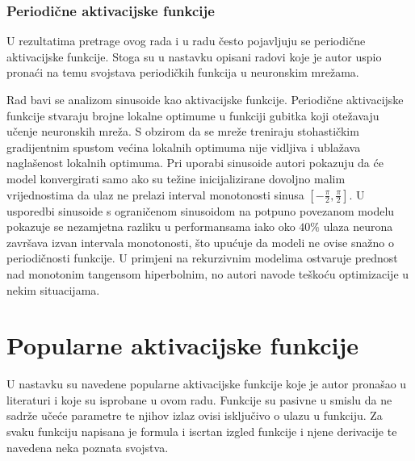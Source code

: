 \documentclass[times, utf8, numeric, diplomski]{fer}
\def\TODO#1{\noindent\textcolor{red}{TODO: \textit{#1}}\newline}
\def\todo#1{\TODO{#1}}
\begin{document}

%

\subsubsection{Periodične aktivacijske funkcije}
U rezultatima pretrage ovog rada i u radu \citet{swish} često pojavljuju se periodične aktivacijske funkcije. Stoga su u nastavku opisani radovi koje je autor uspio pronaći na temu svojstava periodičkih funkcija u neuronskim mrežama.


Rad \citet{taming_waves} bavi se analizom sinusoide kao aktivacijske funkcije. Periodične aktivacijske funkcije stvaraju brojne lokalne optimume u funkciji gubitka koji otežavaju učenje neuronskih mreža. S obzirom da se mreže treniraju stohastičkim gradijentnim spustom većina lokalnih optimuma nije vidljiva i ublažava naglašenost lokalnih optimuma. Pri uporabi sinusoide autori pokazuju da će model konvergirati samo ako su težine inicijalizirane dovoljno malim vrijednostima da ulaz ne prelazi interval monotonosti sinusa $[-\frac{\pi}{2}, \frac{\pi}{2}]$. U usporedbi sinusoide s ograničenom sinusoidom na potpuno povezanom modelu pokazuje se nezamjetna razliku u performansama iako oko $40\%$ ulaza neurona završava izvan intervala monotonosti, što upućuje da modeli ne ovise snažno o periodičnosti funkcije. U primjeni na rekurzivnim modelima ostvaruje prednost nad monotonim tangensom hiperbolnim, no autori navode teškoću optimizacije u nekim situacijama.

\section{Popularne aktivacijske funkcije}
U nastavku su navedene popularne aktivacijske funkcije koje je autor pronašao u literaturi i koje su isprobane u ovom radu. Funkcije su pasivne u smislu da ne sadrže učeće parametre te njihov izlaz ovisi isključivo o ulazu  u funkciju. Za svaku funkciju napisana je formula i iscrtan izgled funkcije i njene derivacije te navedena neka poznata svojstva.
\end{document}
